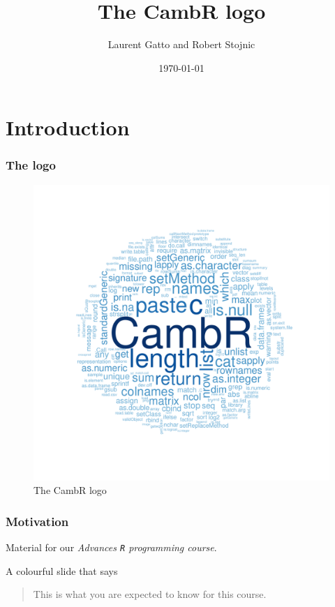\documentclass{beamer}
\title{The CambR logo}
\author{Laurent Gatto and Robert Stojnic}
\date{\today}
\newcommand{\R}{\texttt{R} }
\begin{document}
\maketitle









\section{Introduction}
\label{sec-1}
\begin{frame}
\frametitle{The logo}
\label{sec-1-1}


\begin{figure}[htb]
\centering
\includegraphics[width=.7\linewidth]{./figs/CambR-logo.pdf}
\caption{\label{fig:logo}The CambR logo}
\end{figure}
\end{frame}
\begin{frame}
\frametitle{Motivation}
\label{sec-1-2}


Material for our \emph{Advances \R programming course}. 

A colourful slide that says 
\begin{quote}
This is what you are expected to know for this course.
\end{quote}
\end{frame}
\end{document}
